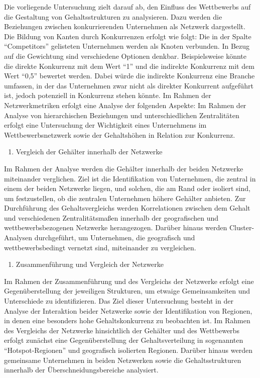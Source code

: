 \documentclass[
]{article}
\providecommand{\tightlist}{%
  \setlength{\itemsep}{0pt}\setlength{\parskip}{0pt}}
\begin{document}
Die vorliegende Untersuchung zielt darauf ab, den Einfluss des
Wettbewerbs auf die Gestaltung von Gehaltsstrukturen zu analysieren.
Dazu werden die Beziehungen zwischen konkurrierenden Unternehmen als
Netzwerk dargestellt. Die Bildung von Kanten durch Konkurrenzen erfolgt
wie folgt: Die in der Spalte ``Competitors'' gelisteten Unternehmen
werden als Knoten verbunden. In Bezug auf die Gewichtung sind
verschiedene Optionen denkbar. Beispielsweise könnte die direkte
Konkurrenz mit dem Wert ``1'' und die indirekte Konkurrenz mit dem Wert
``0,5'' bewertet werden. Dabei würde die indirekte Konkurrenz eine
Branche umfassen, in der das Unternehmen zwar nicht als direkter
Konkurrent aufgeführt ist, jedoch potenziell in Konkurrenz stehen
könnte. Im Rahmen der Netzwerkmetriken erfolgt eine Analyse der
folgenden Aspekte: Im Rahmen der Analyse von hierarchischen Beziehungen
und unterschiedlichen Zentralitäten erfolgt eine Untersuchung der
Wichtigkeit eines Unternehmens im Wettbewerbsnetzwerk sowie der
Gehaltshöhen in Relation zur Konkurrenz.

\begin{enumerate}
\def\labelenumi{\arabic{enumi}.}
\setcounter{enumi}{2}
\tightlist
\item
  Vergleich der Gehälter innerhalb der Netzwerke
\end{enumerate}

Im Rahmen der Analyse werden die Gehälter innerhalb der beiden Netzwerke
miteinander verglichen. Ziel ist die Identifikation von Unternehmen, die
zentral in einem der beiden Netzwerke liegen, und solchen, die am Rand
oder isoliert sind, um festzustellen, ob die zentralen Unternehmen
höhere Gehälter anbieten. Zur Durchführung des Gehaltsvergleichs werden
Korrelationen zwischen dem Gehalt und verschiedenen Zentralitätsmaßen
innerhalb der geografischen und wettbewerbsbezogenen Netzwerke
herangezogen. Darüber hinaus werden Cluster-Analysen durchgeführt, um
Unternehmen, die geografisch und wettbewerbsbedingt vernetzt sind,
miteinander zu vergleichen.

\begin{enumerate}
\def\labelenumi{\arabic{enumi}.}
\setcounter{enumi}{3}
\tightlist
\item
  Zusammenführung und Vergleich der Netzwerke
\end{enumerate}

Im Rahmen der Zusammenführung und des Vergleichs der Netzwerke erfolgt
eine Gegenüberstellung der jeweiligen Strukturen, um etwaige
Gemeinsamkeiten und Unterschiede zu identifizieren. Das Ziel dieser
Untersuchung besteht in der Analyse der Interaktion beider Netzwerke
sowie der Identifikation von Regionen, in denen eine besonders hohe
Gehaltskonkurrenz zu beobachten ist. Im Rahmen des Vergleichs der
Netzwerke hinsichtlich der Gehälter und des Wettbewerbs erfolgt zunächst
eine Gegenüberstellung der Gehaltsverteilung in sogenannten
``Hotspot-Regionen'' und geografisch isolierten Regionen. Darüber hinaus
werden gemeinsame Unternehmen in beiden Netzwerken sowie die
Gehaltsstrukturen innerhalb der Überschneidungsbereiche analysiert.
\end{document}
